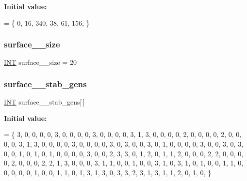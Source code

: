 {\bfseries Initial value\+:}
\begin{DoxyCode}
= \{ 
    0, 16, 340, 38, 61, 156, 
\}
\end{DoxyCode}
\mbox{\label{surface__4_8_c_aacca0e2c0a5c15bbc2535875afdabada}} 
\subsubsection{\texorpdfstring{surface\+\_\+\_\+size}{surface\_4\_size}}
{\footnotesize\ttfamily \mbox{\hyperlink{galois_8h_a09fddde158a3a20bd2dcadb609de11dc}{I\+NT}} surface\+\_\+\_\+size = 20}

\mbox{\label{surface__4_8_c_aaa4cd007c0bfbbe5e2cd525eeddfd7a7}} 
\subsubsection{\texorpdfstring{surface\+\_\+\_\+stab\+\_\+gens}{surface\_4\_stab\_gens}}
{\footnotesize\ttfamily \mbox{\hyperlink{galois_8h_a09fddde158a3a20bd2dcadb609de11dc}{I\+NT}} surface\+\_\+\_\+stab\+\_\+gens\mbox{[}$\,$\mbox{]}}

{\bfseries Initial value\+:}
\begin{DoxyCode}
= \{
    3, 0, 0, 0, 0, 3, 0, 0, 0, 0, 3, 0, 0, 0, 0, 3, 1, 
    3, 0, 0, 0, 0, 2, 0, 0, 0, 0, 2, 0, 0, 0, 0, 3, 1, 
    3, 0, 0, 0, 0, 3, 0, 0, 0, 0, 3, 0, 3, 0, 0, 3, 0, 
    1, 0, 0, 0, 0, 3, 0, 0, 3, 0, 3, 0, 0, 1, 0, 1, 0, 
    1, 0, 0, 0, 0, 3, 0, 0, 2, 3, 3, 0, 1, 2, 0, 1, 1, 
    2, 0, 0, 0, 2, 2, 0, 0, 0, 0, 2, 0, 0, 0, 2, 2, 1, 
    3, 0, 0, 0, 3, 1, 1, 0, 0, 1, 0, 0, 3, 1, 0, 3, 1, 
    0, 1, 0, 0, 1, 1, 0, 0, 0, 0, 0, 1, 0, 0, 1, 1, 0, 
    1, 3, 1, 3, 0, 3, 3, 2, 3, 1, 3, 1, 1, 2, 0, 1, 0, 
\}
\end{DoxyCode}
\mbox{\label{surface__4_8_c_adbaefb29812d9d7cc566efe81166caf5}} 
